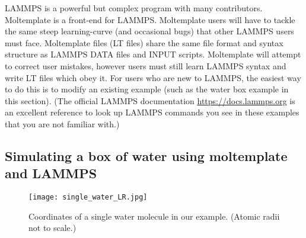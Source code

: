 \documentclass[11pt]{article}
\begin{document}
LAMMPS is a powerful but complex program with many contributors. 
Moltemplate is a front-end for LAMMPS.
Moltemplate users will have to tackle the same steep learning-curve
(and occasional bugs) that other LAMMPS users must face.
Moltemplate files (LT files) share the same file format and 
syntax structure as LAMMPS DATA files and INPUT scripts.
Moltemplate will attempt to correct user mistakes,
however users must still learn 
LAMMPS syntax and write LT files which obey it.
For users who are new to LAMMPS, the easiest way 
to do this is to modify an existing example 
(such as the water box example in this section).
(The official LAMMPS documentation 
\url{https://docs.lammps.org}
is an excellent reference to look up LAMMPS commands
you see in these examples that you are not familiar with.)



\subsection{Simulating a box of water using moltemplate and LAMMPS}
\label{sec:spce_example}

\begin{figure}[htbp]
\centering
\texttt{[image: single\_water\_LR.jpg]}
\caption{
\label{fig:single_water}
Coordinates of a single water molecule in our example.
(Atomic radii not to scale.)
}
\end{figure}
\end{document}
